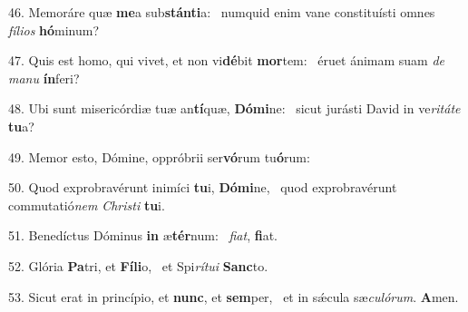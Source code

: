 46. Memoráre quæ \textbf{me}a sub\textbf{stán}\textbf{ti}a: \ast\  numquid enim vane constituísti omnes \textit{fí}\textit{li}\textit{os} \textbf{hó}minum?\

47. Quis est homo, qui vivet, et non vi\textbf{dé}bit \textbf{mor}tem: \ast\  éruet ánimam suam \textit{de} \textit{ma}\textit{nu} \textbf{ín}feri?\

48. Ubi sunt misericórdiæ tuæ an\textbf{tí}quæ, \textbf{Dó}\textbf{mi}ne: \ast\  sicut jurásti David in ve\textit{ri}\textit{tá}\textit{te} \textbf{tu}a?\

49. Memor esto, Dómine, oppróbrii ser\textbf{vó}rum tu\textbf{ó}rum: \ast\  \

50. Quod exprobravérunt inimíci \textbf{tu}i, \textbf{Dó}\textbf{mi}ne, \ast\  quod exprobravérunt commutatió\textit{nem} \textit{Chris}\textit{ti} \textbf{tu}i.\

51. Benedíctus Dóminus \textbf{in} æ\textbf{tér}num: \ast\  \textit{fi}\textit{at}, \textbf{fi}at.\

52. Glória \textbf{Pa}tri, et \textbf{Fí}\textbf{li}o, \ast\  et Spi\textit{rí}\textit{tu}\textit{i} \textbf{Sanc}to.\

53. Sicut erat in princípio, et \textbf{nunc}, et \textbf{sem}per, \ast\  et in sǽcula sæ\textit{cu}\textit{ló}\textit{rum}. \textbf{A}men.\


